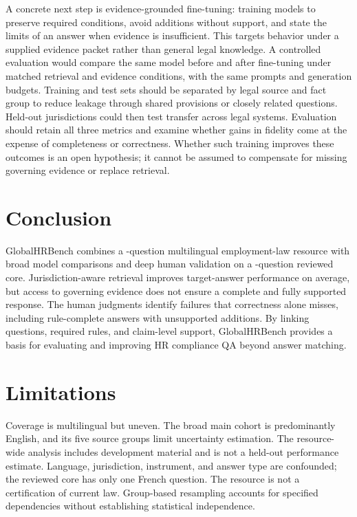 \documentclass[11pt]{article}
\DeclareRobustCommand{\claim}[2]{#2}
\begin{document}
\claim{DISCUSSION}{A concrete next step is evidence-grounded fine-tuning: training models to preserve required conditions, avoid additions without support, and state the limits of an answer when evidence is insufficient. This targets behavior under a supplied evidence packet rather than general legal knowledge. A controlled evaluation would compare the same model before and after fine-tuning under matched retrieval and evidence conditions, with the same prompts and generation budgets. Training and test sets should be separated by legal source and fact group to reduce leakage through shared provisions or closely related questions. Held-out jurisdictions could then test transfer across legal systems. Evaluation should retain all three metrics and examine whether gains in fidelity come at the expense of completeness or correctness. Whether such training improves these outcomes is an open hypothesis; it cannot be assumed to compensate for missing governing evidence or replace retrieval.}

\section{Conclusion}
\claim{CONCLUSION}{GlobalHRBench combines a \RNResource{}-question multilingual employment-law resource with broad model comparisons and deep human validation on a \RNCore{}-question reviewed core. Jurisdiction-aware retrieval improves target-answer performance on average, but access to governing evidence does not ensure a complete and fully supported response. The human judgments identify failures that correctness alone misses, including rule-complete answers with unsupported additions. By linking questions, required rules, and claim-level support, GlobalHRBench provides a basis for evaluating and improving HR compliance QA beyond answer matching.}

\label{sec:content-end}
\section*{Limitations}
\claim{LIMITATIONS}{Coverage is multilingual but uneven. The broad main cohort is predominantly English, and its five source groups limit uncertainty estimation. The resource-wide analysis includes development material and is not a held-out performance estimate. Language, jurisdiction, instrument, and answer type are confounded; the reviewed core has only one French question. The resource is not a certification of current law. Group-based resampling accounts for specified dependencies without establishing statistical independence.}
\end{document}
